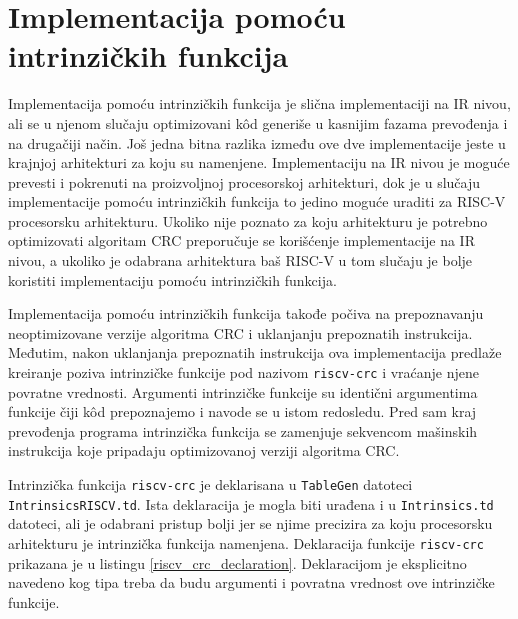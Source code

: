 \documentclass[12pt,oneside]{memoir}
\begin{document}
\section{Implementacija pomoću intrinzičkih funkcija}

Implementacija pomoću intrinzičkih funkcija je slična implementaciji na IR nivou, ali se u njenom slučaju optimizovani k\^od generiše u kasnijim fazama prevođenja i na drugačiji način. Još jedna bitna razlika između ove dve implementacije jeste u krajnjoj arhitekturi za koju su namenjene. Implementaciju na IR nivou je moguće prevesti i pokrenuti na proizvoljnoj procesorskoj arhitekturi, dok je u slučaju implementacije pomoću intrinzičkih funkcija to jedino moguće uraditi za RISC-V procesorsku arhitekturu. Ukoliko nije poznato za koju arhitekturu je potrebno optimizovati algoritam CRC preporučuje se korišćenje implementacije na IR nivou, a ukoliko je odabrana arhitektura baš RISC-V u tom slučaju je bolje koristiti implementaciju pomoću intrinzičkih funkcija. 

Implementacija pomoću intrinzičkih funkcija takođe počiva na prepoznavanju neoptimizovane verzije algoritma CRC i uklanjanju prepoznatih instrukcija. Međutim, nakon uklanjanja prepoznatih instrukcija ova implementacija predlaže kreiranje poziva intrinzičke funkcije pod nazivom \texttt{riscv-crc} i vraćanje njene povratne vrednosti. Argumenti intrinzičke funkcije su identični argumentima funkcije čiji k\^od prepoznajemo i navode se u istom redosledu. Pred sam kraj prevođenja programa intrinzička funkcija se zamenjuje sekvencom mašinskih instrukcija koje pripadaju optimizovanoj verziji algoritma CRC. 


Intrinzička funkcija \texttt{riscv-crc} je deklarisana u \texttt{TableGen} datoteci \texttt{IntrinsicsRISCV.td}. Ista deklaracija je mogla biti urađena i u \texttt{Intrinsics.td} datoteci, ali je odabrani pristup bolji jer se njime precizira za koju procesorsku arhitekturu je intrinzička funkcija namenjena. Deklaracija funkcije \texttt{riscv-crc} prikazana je u listingu \ref{riscv_crc_declaration}. Deklaracijom je eksplicitno navedeno kog tipa treba da budu argumenti i povratna vrednost ove intrinzičke funkcije.
\end{document}
